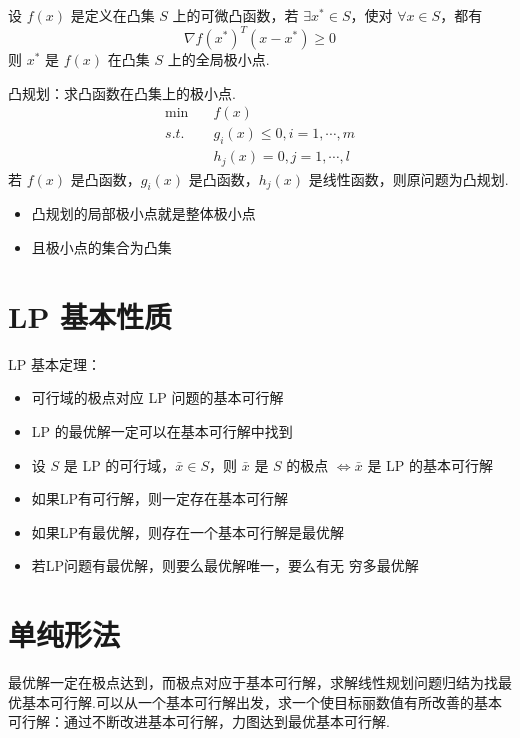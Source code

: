 \begin{remark}
    设 $f(x)$ 是定义在凸集 $S$ 上的可微凸函数，若 $\exists x^* \in S$，使对 $\forall x \in S$，都有 \[\nabla f(x^*)^T(x - x^*) \ge 0\]
    则 $x^*$ 是 $f(x)$ 在凸集 $S$ 上的全局极小点.
\end{remark}

\begin{remark}
    凸规划：求凸函数在凸集上的极小点.
    \begin{align*}
        \min \quad &f(x)\\ 
        s.t. \quad &g_{i}(x) \le 0, i=1, \cdots, m \\  
        &h_{j}(x)=0, j=1, \cdots, l 
    \end{align*}
    若 $f(x)$ 是凸函数，$g_i(x)$ 是凸函数，$h_j(x)$ 是线性函数，则原问题为凸规划.
    \begin{itemize} 
        \item 凸规划的局部极小点就是整体极小点
        \item 且极小点的集合为凸集
    \end{itemize}
\end{remark}

\section{LP 基本性质}
\begin{remark}
    LP 基本定理：
    \begin{itemize}
        \item 可行域的极点对应 LP 问题的基本可行解
        \item LP 的最优解一定可以在基本可行解中找到
        \item 设 $S$ 是 LP 的可行域，$\bar{x} \in S$，则 $\bar{x}$ 是 $S$ 的极点 $\Longleftrightarrow \bar{x}$ 是 LP 的基本可行解
        \item 如果LP有可行解，则一定存在基本可行解
        \item 如果LP有最优解，则存在一个基本可行解是最优解
        \item 若LP问题有最优解，则要么最优解唯一，要么有无
        穷多最优解
    \end{itemize}
\end{remark}

\section{单纯形法}
\begin{remark}
    最优解一定在极点达到，而极点对应于基本可行解，求解线性规划问题归结为找最优基本可行解.可以从一个基本可行解出发，求一个使目标丽数值有所改善的基本可行解：通过不断改进基本可行解，力图达到最优基本可行解.
\end{remark}

